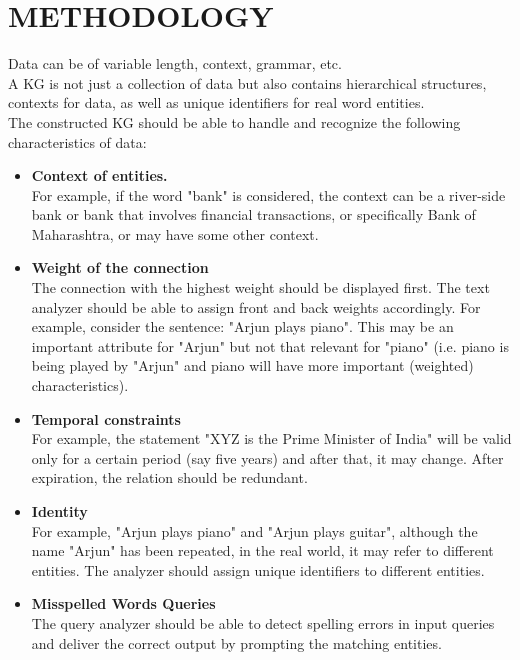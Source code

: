 \documentclass[conference]{IEEEtran}
\begin{document}
\section{METHODOLOGY}
Data can be of variable length, context, grammar, etc.
\\A KG is not just a collection of data  \cite{b8} but also contains hierarchical structures, contexts for data, as well as unique identifiers for real word entities.
\\
The constructed KG should be able to handle and recognize the following characteristics of data:
\begin{itemize}
    \item\textbf{Context of entities.}\cite{b8}\\ 
    For example, if the word "bank" is considered, the context can be a river-side bank or bank that involves financial transactions, or specifically Bank of Maharashtra, or may have some other context.
    

    
	\item\textbf{Weight of the connection}
 \\
 The connection with the highest weight should be displayed first.
The text analyzer should be able to assign front and back weights accordingly. For example, consider the sentence: "Arjun plays piano". This may be an important attribute for "Arjun" but not that relevant for "piano" (i.e. piano is being played by "Arjun" and piano will have more important (weighted) characteristics). 

 
	\item\textbf{Temporal constraints} \cite{b8, b17}
 \\
 For example, the statement "XYZ is the Prime Minister of India" will be valid only for a certain period (say five years) and after that, it may change. After expiration, the relation should be redundant.

 
	\item\textbf{Identity} \cite{b8,b16}
 \\
 For example, "Arjun plays piano" and "Arjun plays guitar", although the name "Arjun" has been repeated, in the real world, it may refer to different entities. 
 The analyzer should assign unique identifiers to different entities.
	
 \item\textbf{Misspelled Words Queries} 
 \\
 The query analyzer should be able to detect spelling errors in input queries and deliver the correct output by prompting the matching entities.
 
\end{itemize}
\end{document}

